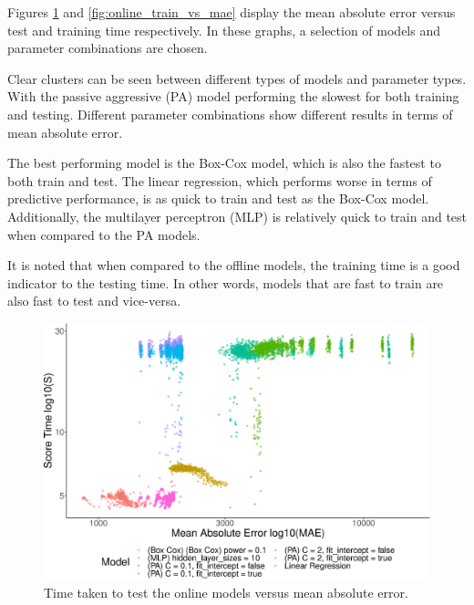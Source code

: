 Figures \ref{fig:online_test_vs_mae} and \ref{fig:online_train_vs_mae} display the mean absolute error versus test and training time respectively. In these graphs, a selection of models and parameter combinations are chosen. 

Clear clusters can be seen between different types of models and parameter types. With the passive aggressive (PA) model performing the slowest for both training and testing. Different parameter combinations show different results in terms of mean absolute error.

The best performing model is the Box-Cox model, which is also the fastest to both train and test. The linear regression, which performs worse in terms of predictive performance, is as quick to train and test as the Box-Cox model. Additionally, the multilayer perceptron (MLP) is relatively quick to train and test when compared to the PA models. 

It is noted that when compared to the offline models, the training time is a good indicator to the testing time. In other words, models that are fast to train are also fast to test and vice-versa.




\begin{figure}[h]
\centering
\includegraphics[width=\columnwidth]{Chapter5/figures/market-forecasting/results/online_testing_time_vs_mae_all_results_opaque.eps}
\caption{Time taken to test the online models versus mean absolute error.}
\label{fig:online_test_vs_mae}
\end{figure}

